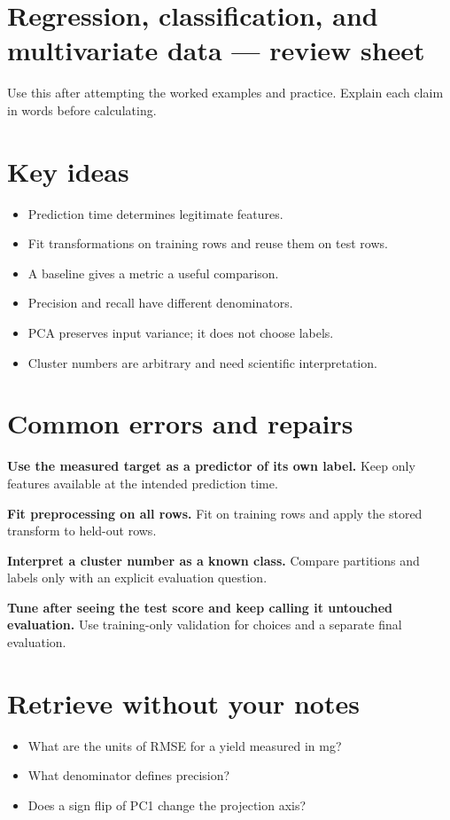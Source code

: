 \documentclass[11pt,letterpaper]{article}
\theoremstyle{definition}\newtheorem{definition}{Definition}\newtheorem{example}{Example}
\numberwithin{equation}{section}
\begin{document}
\setlength{\parskip}{4pt}
\section*{Regression, classification, and multivariate data --- review sheet}
Use this after attempting the worked examples and practice. Explain each claim in words before calculating.

\section*{Key ideas}
\begin{itemize}
\item Prediction time determines legitimate features.
\item Fit transformations on training rows and reuse them on test rows.
\item A baseline gives a metric a useful comparison.
\item Precision and recall have different denominators.
\item PCA preserves input variance; it does not choose labels.
\item Cluster numbers are arbitrary and need scientific interpretation.
\end{itemize}
\section*{Common errors and repairs}
\textbf{Use the measured target as a predictor of its own label.} Keep only features available at the intended prediction time.

\textbf{Fit preprocessing on all rows.} Fit on training rows and apply the stored transform to held-out rows.

\textbf{Interpret a cluster number as a known class.} Compare partitions and labels only with an explicit evaluation question.

\textbf{Tune after seeing the test score and keep calling it untouched evaluation.} Use training-only validation for choices and a separate final evaluation.

\section*{Retrieve without your notes}
\begin{itemize}
\item What are the units of RMSE for a yield measured in mg?
\item What denominator defines precision?
\item Does a sign flip of PC1 change the projection axis?
\end{itemize}
\end{document}
